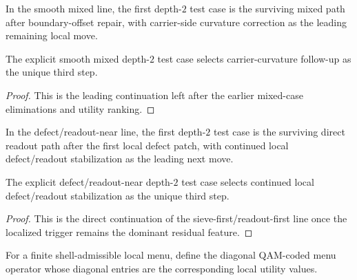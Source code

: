 \begin{definition}
\label{def:first-explicit-smooth-mixed-depth-2-test-case}
In the smooth mixed line, the first depth-$2$ test case is the surviving mixed path after boundary-offset repair, with carrier-side curvature correction as the leading remaining local move.
\end{definition}

\begin{proposition}
\label{prop:first-explicit-third-step-priority-in-the-smooth-mixed-line}
The explicit smooth mixed depth-$2$ test case selects carrier-curvature follow-up as the unique third step.
\end{proposition}

\begin{proof}
This is the leading continuation left after the earlier mixed-case eliminations and utility ranking.
\end{proof}

\begin{definition}
\label{def:first-explicit-defectreadout-near-depth-2-test-case}
In the defect/readout-near line, the first depth-$2$ test case is the surviving direct readout path after the first local defect patch, with continued local defect/readout stabilization as the leading next move.
\end{definition}

\begin{proposition}
\label{prop:first-explicit-third-step-priority-in-the-defectreadout-near-line}
The explicit defect/readout-near depth-$2$ test case selects continued local defect/readout stabilization as the unique third step.
\end{proposition}

\begin{proof}
This is the direct continuation of the sieve-first/readout-first line once the localized trigger remains the dominant residual feature.
\end{proof}

\begin{definition}
\label{def:first-qam-coded-local-spectral-menu-operator}
For a finite shell-admissible local menu, define the diagonal QAM-coded menu operator whose diagonal entries are the corresponding local utility values.
\end{definition}

